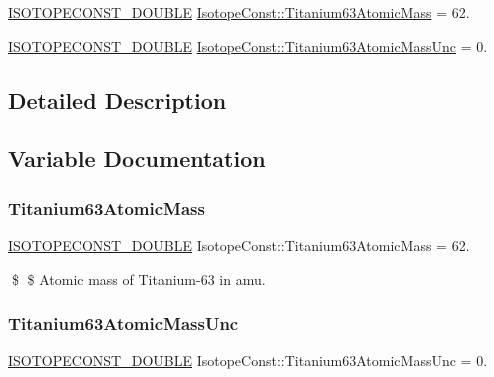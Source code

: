 \begin{DoxyCompactItemize}
\item 
\mbox{\hyperlink{group___isotope_const-_macros_ga8f45a7272ce02c0b4c65c44636ed719a}{I\+S\+O\+T\+O\+P\+E\+C\+O\+N\+S\+T\+\_\+\+D\+O\+U\+B\+LE}} \mbox{\hyperlink{group___isotope_const-_titanium-_ti63_ga240320bb1b066068f4ad9a5b268418bf}{Isotope\+Const\+::\+Titanium63\+Atomic\+Mass}} = 62.
\item 
\mbox{\hyperlink{group___isotope_const-_macros_ga8f45a7272ce02c0b4c65c44636ed719a}{I\+S\+O\+T\+O\+P\+E\+C\+O\+N\+S\+T\+\_\+\+D\+O\+U\+B\+LE}} \mbox{\hyperlink{group___isotope_const-_titanium-_ti63_ga6ba6046391509d5ef251ad663a6919c1}{Isotope\+Const\+::\+Titanium63\+Atomic\+Mass\+Unc}} = 0.
\end{DoxyCompactItemize}


\subsection{Detailed Description}


\subsection{Variable Documentation}
\mbox{\label{group___isotope_const-_titanium-_ti63_ga240320bb1b066068f4ad9a5b268418bf}} 
\subsubsection{\texorpdfstring{Titanium63\+Atomic\+Mass}{Titanium63AtomicMass}}
{\footnotesize\ttfamily \mbox{\hyperlink{group___isotope_const-_macros_ga8f45a7272ce02c0b4c65c44636ed719a}{I\+S\+O\+T\+O\+P\+E\+C\+O\+N\+S\+T\+\_\+\+D\+O\+U\+B\+LE}} Isotope\+Const\+::\+Titanium63\+Atomic\+Mass = 62.}

\$ \$ Atomic mass of Titanium-\/63 in amu. \mbox{\label{group___isotope_const-_titanium-_ti63_ga6ba6046391509d5ef251ad663a6919c1}} 
\subsubsection{\texorpdfstring{Titanium63\+Atomic\+Mass\+Unc}{Titanium63AtomicMassUnc}}
{\footnotesize\ttfamily \mbox{\hyperlink{group___isotope_const-_macros_ga8f45a7272ce02c0b4c65c44636ed719a}{I\+S\+O\+T\+O\+P\+E\+C\+O\+N\+S\+T\+\_\+\+D\+O\+U\+B\+LE}} Isotope\+Const\+::\+Titanium63\+Atomic\+Mass\+Unc = 0.}

